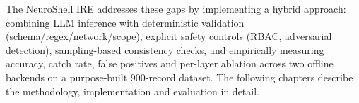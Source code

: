 The NeuroShell IRE addresses these gaps by implementing a hybrid approach: combining LLM inference with deterministic validation (schema/regex/network/scope), explicit safety controls (RBAC, adversarial detection), sampling-based consistency checks, and empirically measuring accuracy, catch rate, false positives and per-layer ablation across two offline backends on a purpose-built 900-record dataset. The following chapters describe the methodology, implementation and evaluation in detail.